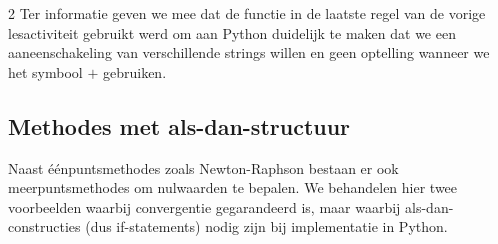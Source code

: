     \begin{multicols}{2}
    Ter informatie geven we mee dat de functie  in de laatste regel van de vorige lesactiviteit gebruikt werd om aan Python duidelijk te maken dat we een aaneenschakeling van verschillende strings willen en geen optelling wanneer we het symbool $+$ gebruiken.
    \subsection{Methodes met als-dan-structuur}
    Naast éénpuntsmethodes zoals Newton-Raphson bestaan er ook meerpuntsmethodes om nulwaarden te bepalen. We behandelen hier twee voorbeelden waarbij convergentie gegarandeerd is, maar waarbij als-dan-constructies (dus if-statements) nodig zijn bij implementatie in Python.\\

    \end{multicols}

